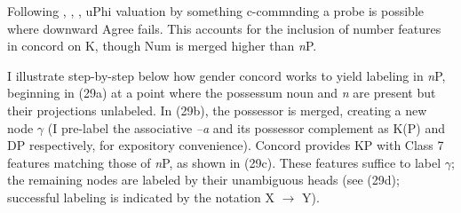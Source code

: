 \documentclass[output=paper
,modfonts
,nonflat]{langsci/langscibook}
\begin{document}
{\begin{figure}[!h]
\begin{exe}
		\ex 
	\xlist
	\begin{multicols}{2}
\end{multicols}
	\endxlist
\end{exe}
\end{figure}
\noindent Following \citet{Bejar_Rezac2009}, \citet{Carstens2016}, \citet{Toosarvandani_Van_Urk2014}, uPhi valuation by something c-commnding a probe is possible where downward Agree fails. This accounts for the inclusion of number features in concord on K, though Num is merged higher than \textit{n}P.

I illustrate step-by-step below how gender concord works to yield labeling in \textit{n}P, beginning in (29a) at a point where the possessum noun and \textit{n} are present but their projections unlabeled. In (29b), the possessor is merged, creating a new node $\gamma$ (I pre-label the associative \textit{–a} and its possessor complement as K(P) and DP respectively, for expository convenience). Concord provides KP with Class 7 features matching those of \textit{n}P, as shown in (29c). These features suffice to label $\gamma$;  the remaining nodes are labeled by their unambiguous heads (see (29d); successful labeling is indicated by the notation X $\rightarrow$ Y).

}
\end{document}
